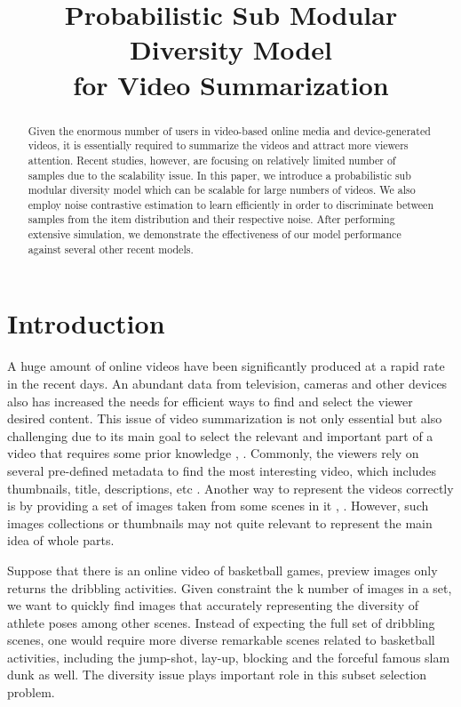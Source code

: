 \documentclass[conference]{IEEEtran}
\begin{document}
\title{Probabilistic Sub Modular Diversity Model \\for Video Summarization}

\author{
\IEEEauthorblockA{-}
}
\maketitle

\begin{abstract}
Given the enormous number of users in video-based online media and device-generated videos, it is essentially required to summarize the videos and attract more viewers attention. Recent studies, however, are focusing on relatively limited number of samples due to the scalability issue. In this paper, we introduce a probabilistic sub modular diversity model which can be scalable for large numbers of videos. We also employ noise contrastive estimation to learn efficiently in order to discriminate between samples from the item distribution and their respective noise. After performing extensive simulation, we demonstrate the effectiveness of our model performance against several other recent models.
\end{abstract}

\IEEEpeerreviewmaketitle



\section{Introduction}
A huge amount of online videos have been significantly produced at a rapid rate in the recent days. An abundant data from television, cameras and other devices also has increased the needs for efficient ways to find and select the viewer desired content. This issue of video summarization is not only essential but also challenging due to its main goal to select the relevant and important part of a video that requires some prior knowledge \cite{ajmal2012}, \cite{otani2016}. Commonly, the viewers rely on several pre-defined metadata to find the most interesting video, which includes thumbnails, title, descriptions, etc \cite{song2016}. Another way to represent the videos correctly is by providing a set of images taken from some scenes in it \cite{tvsum}, \cite{kulesza2011}. However, such images collections or thumbnails may not quite relevant to represent the main idea of whole parts.

Suppose that there is an online video of basketball games, preview images only returns the dribbling activities. Given constraint the k number of images in a set, we want to quickly find images that accurately representing the diversity of athlete poses among other scenes. Instead of expecting the full set of dribbling scenes, one would require more diverse remarkable scenes related to basketball activities, including the jump-shot, lay-up, blocking and the forceful famous slam dunk as well. The diversity issue plays important role in this subset selection problem. 
\end{document}
